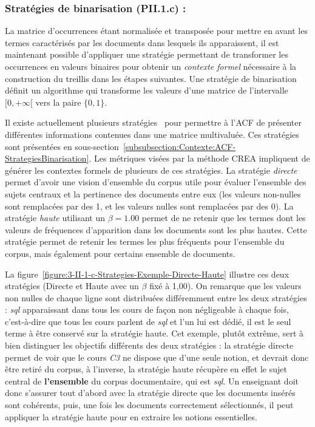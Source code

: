 \subsubsection{Stratégies de binarisation (PII.1.c) :}
\label{subsubsection:CREA:PII.1.c-strategies}

La matrice d'occurrences étant normalisée et transposée pour mettre en avant les termes caractérisés par les documents dans lesquels ils apparaissent, il est maintenant possible d'appliquer une stratégie permettant de transformer les occurrences en valeurs binaires pour obtenir un \textit{contexte formel} nécessaire à la construction du treillis dans les étapes suivantes.
Une stratégie de binarisation définit un algorithme qui transforme les valeurs d'une matrice de l'intervalle $ [ 0, +\infty [ $ vers la paire $ \{ 0, 1 \} $.

\bigskip

Il existe actuellement plusieurs stratégies~\cite{jaffal2015refinement}\cite{jaffal2019aide} pour permettre à l'ACF de présenter différentes informations contenues dans une matrice multivaluée.
Ces stratégies sont présentées en sous-section~\ref{subsubsection:Contexte:ACF-StrategiesBinarisation}.
Les métriques visées par la méthode CREA impliquent de générer les contextes formels de plusieurs de ces stratégies.
La stratégie \textit{directe} permet d'avoir une vision d'ensemble du corpus utile pour évaluer l'ensemble des sujets centraux et la pertinence des documents entre eux (les valeurs non-nulles sont remplacées par des 1, et les valeurs nulles sont remplacées par des 0).
La stratégie \textit{haute} utilisant un $ \beta = 1.00 $ permet de ne retenir que les termes dont les valeurs de fréquences d'apparition dans les documents sont les plus hautes.
Cette stratégie permet de retenir les termes les plus fréquents pour l'ensemble du corpus, mais également pour certains ensemble de documents.

\bigskip

La figure~\ref{figure:3-II-1-c-Strategies-Exemple-Directe-Haute} illustre ces deux stratégies (Directe et Haute avec un $ \beta $ fixé à 1,00).
On remarque que les valeurs non nulles de chaque ligne sont distribuées différemment entre les deux stratégies : \textit{sql} apparaissant dans tous les cours de façon non négligeable à chaque fois, c'est-à-dire que tous les cours parlent de \textit{sql} et l'un lui est dédié, il est le seul terme à être conservé sur la stratégie haute.
Cet exemple, plutôt extrême, sert à bien distinguer les objectifs différents des deux stratégies : la stratégie directe permet de voir que le cours \textit{C3} ne dispose que d'une seule notion, et devrait donc être retiré du corpus, à l'inverse, la stratégie haute récupère en effet le sujet central de \textbf{l'ensemble} du corpus documentaire, qui est \textit{sql}.
Un enseignant doit donc s'assurer tout d'abord avec la stratégie directe que les documents insérés sont cohérents, puis, une fois les documents correctement sélectionnés, il peut appliquer la stratégie haute pour en extraire les notions essentielles.


